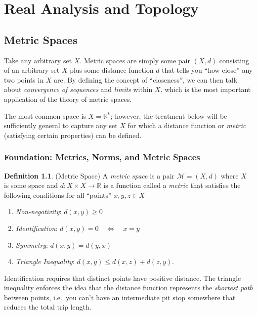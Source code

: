 \documentclass[12pt]{book}
\numberwithin{equation}{section} %
\theoremstyle{plain}
\theoremstyle{definition}
\newtheorem{defn}[thm]{Definition}
\theoremstyle{remark}
\newcommand{\R}{\mathbb{R}}
\begin{document}
\chapter{Real Analysis and Topology}


\clearpage
\section{Metric Spaces}

Take any arbitrary set $X$. Metric spaces are simply some pair $(X,d)$
consisting of an arbitrary set $X$ plus some distance function $d$ that
tells you ``how close'' any two points in $X$ are.
By defining the concept of ``closeness'', we can then talk about
\emph{convergence of sequences} and \emph{limits} within $X$, which is
the most important application of the theory of metric spaces.

The most common space is $X=\R^k$; however, the treatment below
will be sufficiently general to capture any set $X$ for which a distance
function or \emph{metric} (satisfying certain properties) can be
defined.


\subsection{Foundation: Metrics, Norms, and Metric Spaces}

\begin{defn}{(Metric Space)}
\label{defn:metric}
A \emph{metric space} is a pair $\mathscr{M}=(X,d)$ where $X$ is some
space and $d:X\times X\rightarrow \R$ is a function
called a \emph{metric} that satisfies the following conditions for all
``points'' $x,y,z\in X$
\begin{enumerate}
  \item \emph{Non-negativity}: $d(x,y)\geq 0$
  \item \emph{Identification}: $d(x,y) = 0 \quad \Leftrightarrow \quad x=y$
  \item \emph{Symmetry}: $d(x,y)=d(y,x)$
  \item \emph{Triangle Inequality}: $d(x,y) \leq d(x,z) + d(z,y)$.
\end{enumerate}
Identification requires that distinct points have positive distance.
The triangle inequality enforces the idea that the distance function
represents the \emph{shortest path} between points, i.e.\ you can't have
an intermediate pit stop somewhere that reduces the total trip length.
\end{defn}
\end{document}
